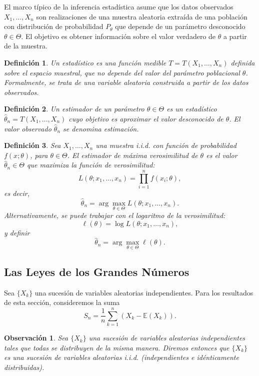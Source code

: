 \documentclass{report}
\newtheorem{dfn}{Definición}[section]
\newtheorem{obs}{Observación}[section]
\begin{document}
El marco típico de la inferencia estadística asume que los datos observados \( X_1, \dots, X_n \) son realizaciones de una muestra aleatoria extraída de una 
población con distribución de probabilidad \( P_\theta \) que depende de un parámetro desconocido \( \theta \in \Theta \). El objetivo es obtener información 
sobre el valor verdadero de \( \theta \) a partir de la muestra.

\begin{dfn}
Un \emph{estadístico} es una función medible \( T = T(X_1, \dots, X_n) \) definida sobre el espacio muestral, que no depende del valor del parámetro poblacional 
\( \theta \). Formalmente, se trata de una variable aleatoria construida a partir de los datos observados.
\end{dfn}

\begin{dfn}
Un \emph{estimador} de un parámetro \( \theta \in \Theta \) es un estadístico \( \hat{\theta}_n = T(X_1, \dots, X_n) \) cuyo objetivo es aproximar el valor 
desconocido de \( \theta \). El valor observado \( \hat{\theta}_n \) se denomina \emph{estimación}.
\end{dfn}

\begin{dfn}
Sea \( X_1, \dots, X_n \) una muestra i.i.d. con función de probabilidad \( f(x;\theta) \), para \( \theta \in \Theta \). El \emph{estimador de máxima verosimilitud} 
de \( \theta \) es el valor \( \hat{\theta}_n \in \Theta \) que maximiza la función de verosimilitud:
\[
L(\theta; x_1, \dots, x_n) = \prod_{i=1}^n f(x_i; \theta),
\]
es decir,
\[
\hat{\theta}_n = \arg\max_{\theta \in \Theta} L(\theta; x_1, \dots, x_n).
\]
Alternativamente, se puede trabajar con el logaritmo de la verosimilitud:
\[
\ell(\theta) = \log L(\theta; x_1, \dots, x_n),
\]
y definir
\[
\hat{\theta}_n = \arg\max_{\theta \in \Theta} \ell(\theta).
\]
\end{dfn}

\subsection{Las Leyes de los Grandes Números}

Sea $\{X_k\}$ una sucesión de variables aleatorias independientes. Para los resultados de esta sección, consideremos la suma
$$ S_n = \frac{1}{n}\sum_{k=1}^{n}(X_k-\mathbb{E}(X_k)).$$

\begin{obs}
Sea $\{X_k\}$ una sucesión de variables aleatorias independientes tales que todas se distribuyen de la misma manera. 
Diremos entonces que  $\{X_k\}$ es una sucesión de variables aleatorias \emph{i.i.d.} (independientes e idénticamente
distribuidas).
\end{obs}
\end{document}
